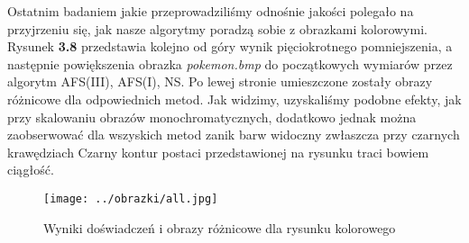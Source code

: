 Ostatnim badaniem jakie przeprowadziliśmy odnośnie jakości polegało na przyjrzeniu się,
jak nasze algorytmy poradzą sobie z obrazkami kolorowymi. Rysunek \textbf{3.8}
przedstawia kolejno od góry wynik pięciokrotnego pomniejszenia, a następnie
powiększenia obrazka \textit{pokemon.bmp} do początkowych wymiarów przez algorytm AFS(III), AFS(I), NS. Po lewej stronie umieszczone zostały obrazy różnicowe dla odpowiednich metod. Jak widzimy, uzyskaliśmy podobne efekty,
jak przy skalowaniu obrazów monochromatycznych, dodatkowo jednak można zaobserwować
dla wszyskich metod zanik barw widoczny zwłaszcza przy czarnych krawędziach
Czarny kontur postaci przedstawionej na rysunku traci bowiem ciągłość.
\begin{figure}[h!tb]
\begin{center}
\texttt{[image: ../obrazki/all.jpg]}
\caption{Wyniki doświadczeń i obrazy różnicowe dla rysunku kolorowego}
\end{center}
\end{figure}







